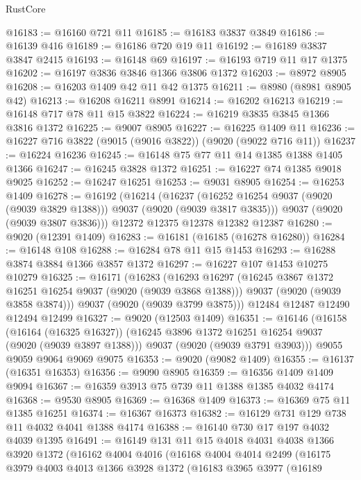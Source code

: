 \begin{lexlean}{RustCore}
\begin{coremodule}
@16183 := @16160 @721 @11
@16185 := @16183 @3837 @3849
@16186 := @16139 @416
@16189 := @16186 @720 @19 @11
@16192 := @16189 @3837 @3847 @2415
@16193 := @16148 @69
@16197 := @16193 @719 @11 @17 @1375
@16202 := @16197 @3836 @3846 @1366 @3806 @1372
@16203 := @8972 @8905
@16208 := @16203 @1409 @42 @11 @42 @1375
@16211 := @8980 (@8981 @8905 @42)
@16213 := @16208 @16211 @8991
@16214 := @16202 @16213
@16219 := @16148 @717 @78 @11 @15 @3822
@16224 := @16219 @3835 @3845 @1366 @3816 @1372
@16225 := @9007 @8905
@16227 := @16225 @1409 @11
@16236 := @16227 @716 @3822 (@9015 (@9016 @3822)) (@9020 (@9022 @716 @11))
@16237 := @16224 @16236
@16245 := @16148 @75 @77 @11 @14 @1385 @1388 @1405 @1366
@16247 := @16245 @3828 @1372
@16251 := @16227 @74 @1385 @9018 @9025
@16252 := @16247 @16251
@16253 := @9031 @8905
@16254 := @16253 @1409
@16278 := @16192
    (@16214
      (@16237 (@16252 @16254 @9037 (@9020 (@9039 @3829 @1388))) @9037 (@9020 (@9039 @3817 @3835)))
      @9037
      (@9020 (@9039 @3807 @3836)))
    @12372
    @12375
    @12378
    @12382
    @12387
@16280 := @9020 (@12391 @1409)
@16283 := @16181 (@16185 (@16278 @16280))
@16284 := @16148 @108
@16288 := @16284 @78 @11 @15 @1453
@16293 := @16288 @3874 @3884 @1366 @3857 @1372
@16297 := @16227 @107 @1453 @10275 @10279
@16325 := @16171
    (@16283
      (@16293
        @16297
        (@16245 @3867 @1372 @16251 @16254 @9037 (@9020 (@9039 @3868 @1388)))
        @9037
        (@9020 (@9039 @3858 @3874)))
      @9037
      (@9020 (@9039 @3799 @3875)))
    @12484
    @12487
    @12490
    @12494
    @12499
@16327 := @9020 (@12503 @1409)
@16351 := @16146
    (@16158
      (@16164 (@16325 @16327))
      (@16245 @3896 @1372 @16251 @16254 @9037 (@9020 (@9039 @3897 @1388)))
      @9037
      (@9020 (@9039 @3791 @3903)))
    @9055
    @9059
    @9064
    @9069
    @9075
@16353 := @9020 (@9082 @1409)
@16355 := @16137 (@16351 @16353)
@16356 := @9090 @8905
@16359 := @16356 @1409 @1409 @9094
@16367 := @16359 @3913 @75 @739 @11 @1388 @1385 @4032 @4174
@16368 := @9530 @8905
@16369 := @16368 @1409
@16373 := @16369 @75 @11 @1385 @16251
@16374 := @16367 @16373
@16382 := @16129 @731 @129 @738 @11 @4032 @4041 @1388 @4174
@16388 := @16140 @730 @17 @197 @4032 @4039 @1395
@16491 := @16149
    @131
    @11
    @15
    @4018
    @4031
    @4038
    @1366
    @3920
    @1372
    (@16162
      @4004
      @4016
      (@16168
        @4004
        @4014
        @2499
        (@16175
          @3979
          @4003
          @4013
          @1366
          @3928
          @1372
          (@16183
            @3965
            @3977
            (@16189

\end{coremodule}
\end{lexlean}
